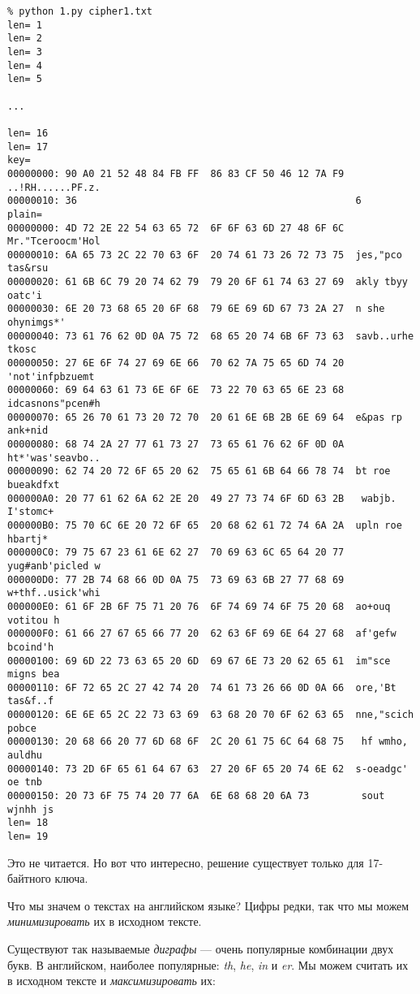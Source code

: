 \begin{lstlisting}
% python 1.py cipher1.txt
len= 1
len= 2
len= 3
len= 4
len= 5

...

len= 16
len= 17
key=
00000000: 90 A0 21 52 48 84 FB FF  86 83 CF 50 46 12 7A F9  ..!RH......PF.z.
00000010: 36                                                6
plain=
00000000: 4D 72 2E 22 54 63 65 72  6F 6F 63 6D 27 48 6F 6C  Mr."Tceroocm'Hol
00000010: 6A 65 73 2C 22 70 63 6F  20 74 61 73 26 72 73 75  jes,"pco tas&rsu
00000020: 61 6B 6C 79 20 74 62 79  79 20 6F 61 74 63 27 69  akly tbyy oatc'i
00000030: 6E 20 73 68 65 20 6F 68  79 6E 69 6D 67 73 2A 27  n she ohynimgs*'
00000040: 73 61 76 62 0D 0A 75 72  68 65 20 74 6B 6F 73 63  savb..urhe tkosc
00000050: 27 6E 6F 74 27 69 6E 66  70 62 7A 75 65 6D 74 20  'not'infpbzuemt
00000060: 69 64 63 61 73 6E 6F 6E  73 22 70 63 65 6E 23 68  idcasnons"pcen#h
00000070: 65 26 70 61 73 20 72 70  20 61 6E 6B 2B 6E 69 64  e&pas rp ank+nid
00000080: 68 74 2A 27 77 61 73 27  73 65 61 76 62 6F 0D 0A  ht*'was'seavbo..
00000090: 62 74 20 72 6F 65 20 62  75 65 61 6B 64 66 78 74  bt roe bueakdfxt
000000A0: 20 77 61 62 6A 62 2E 20  49 27 73 74 6F 6D 63 2B   wabjb. I'stomc+
000000B0: 75 70 6C 6E 20 72 6F 65  20 68 62 61 72 74 6A 2A  upln roe hbartj*
000000C0: 79 75 67 23 61 6E 62 27  70 69 63 6C 65 64 20 77  yug#anb'picled w
000000D0: 77 2B 74 68 66 0D 0A 75  73 69 63 6B 27 77 68 69  w+thf..usick'whi
000000E0: 61 6F 2B 6F 75 71 20 76  6F 74 69 74 6F 75 20 68  ao+ouq votitou h
000000F0: 61 66 27 67 65 66 77 20  62 63 6F 69 6E 64 27 68  af'gefw bcoind'h
00000100: 69 6D 22 73 63 65 20 6D  69 67 6E 73 20 62 65 61  im"sce migns bea
00000110: 6F 72 65 2C 27 42 74 20  74 61 73 26 66 0D 0A 66  ore,'Bt tas&f..f
00000120: 6E 6E 65 2C 22 73 63 69  63 68 20 70 6F 62 63 65  nne,"scich pobce
00000130: 20 68 66 20 77 6D 68 6F  2C 20 61 75 6C 64 68 75   hf wmho, auldhu
00000140: 73 2D 6F 65 61 64 67 63  27 20 6F 65 20 74 6E 62  s-oeadgc' oe tnb
00000150: 20 73 6F 75 74 20 77 6A  6E 68 68 20 6A 73         sout wjnhh js
len= 18
len= 19
\end{lstlisting}

Это не читается. Но вот что интересно, решение существует только для 17-байтного ключа.

Что мы значем о текстах на английском языке?
Цифры редки, так что мы можем \textit{минимизировать} их в исходном тексте.

Существуют так называемые \textit{диграфы} --- очень популярные комбинации двух букв.
В английском, наиболее популярные: \textit{th}, \textit{he}, \textit{in} и \textit{er}.
Мы можем считать их в исходном тексте и \textit{максимизировать} их:

